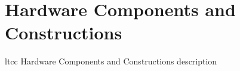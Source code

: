 \section{Hardware Components and Constructions}

ltcc Hardware Components and Constructions description

